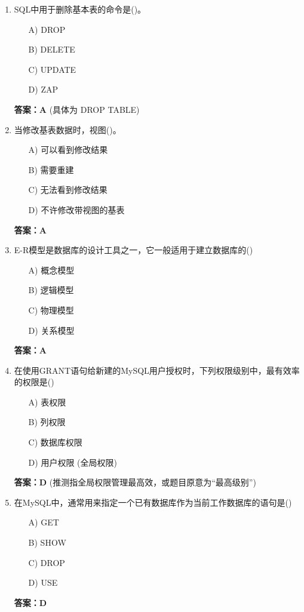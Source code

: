 \documentclass[a4paper,12pt]{article}
\begin{document}
\begin{enumerate}[label=\arabic*.]
\item SQL中用于删除基本表的命令是()。
\begin{itemize}
    \item[A)] DROP
    \item[B)] DELETE
    \item[C)] UPDATE
    \item[D)] ZAP
\end{itemize}
\textbf{答案：A} (具体为 DROP TABLE)

\item 当修改基表数据时，视图()。
\begin{itemize}
    \item[A)] 可以看到修改结果
    \item[B)] 需要重建
    \item[C)] 无法看到修改结果
    \item[D)] 不许修改带视图的基表
\end{itemize}
\textbf{答案：A}

\item E-R模型是数据库的设计工具之一，它一般适用于建立数据库的()
\begin{itemize}
    \item[A)] 概念模型
    \item[B)] 逻辑模型
    \item[C)] 物理模型
    \item[D)] 关系模型
\end{itemize}
\textbf{答案：A}

\item 在使用GRANT语句给新建的MySQL用户授权时，下列权限级别中，最有效率的权限是() 
\begin{itemize}
    \item[A)] 表权限
    \item[B)] 列权限
    \item[C)] 数据库权限
    \item[D)] 用户权限 (全局权限)
\end{itemize}
\textbf{答案：D} (推测指全局权限管理最高效，或题目原意为“最高级别”)

\item 在MySQL中，通常用来指定一个已有数据库作为当前工作数据库的语句是()
\begin{itemize}
    \item[A)] GET
    \item[B)] SHOW
    \item[C)] DROP
    \item[D)] USE
\end{itemize}
\textbf{答案：D}


\end{enumerate}
\end{document}

